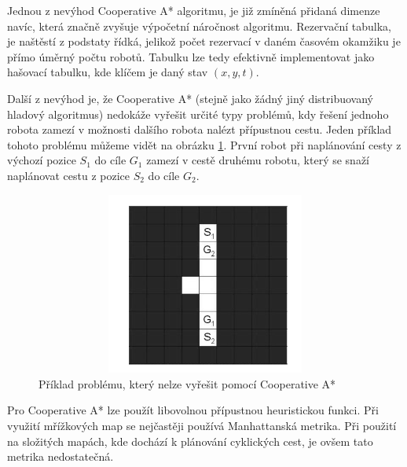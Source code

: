 Jednou z nevýhod Cooperative A* algoritmu, je již zmíněná přidaná dimenze navíc, která značně zvyšuje výpočetní náročnost algoritmu. Rezervační tabulka, je naštěstí z podstaty řídká, jelikož počet rezervací v daném časovém okamžiku je přímo úměrný počtu robotů. Tabulku lze tedy efektivně implementovat jako hašovací tabulku, kde klíčem je daný stav $\left(x,y,t\right)$.

Další z nevýhod je, že Cooperative A* (stejně jako žádný jiný distribuovaný hladový algoritmus) nedokáže vyřešit určité typy problémů, kdy řešení jednoho robota zamezí v možnosti dalšího robota nalézt přípustnou cestu. Jeden příklad tohoto problému můžeme vidět na obrázku \ref{obr:unsolvableCoopProblem}. První robot při naplánování cesty z výchozí pozice $S_1$ do cíle $G_1$ zamezí v cestě druhému robotu, který se snaží naplánovat cestu z pozice $S_2$ do cíle $G_2$.

\begin{figure}[htb]
	\begin{center}
		\includegraphics*[width=15cm,height=6cm,keepaspectratio]{obr/unsolvableCoopProblem}
	\end{center}
	\caption[caption]{Příklad problému, který nelze vyřešit pomocí Cooperative A* \cite{Silver2005}}
	\label{obr:unsolvableCoopProblem}
\end{figure}

Pro Cooperative A* lze použít libovolnou přípustnou heuristickou funkci. Při využití mřížkových map se nejčastěji používá Manhattanská metrika. Při použití na složitých mapách, kde dochází k plánování cyklických cest, je ovšem tato metrika nedostatečná.

